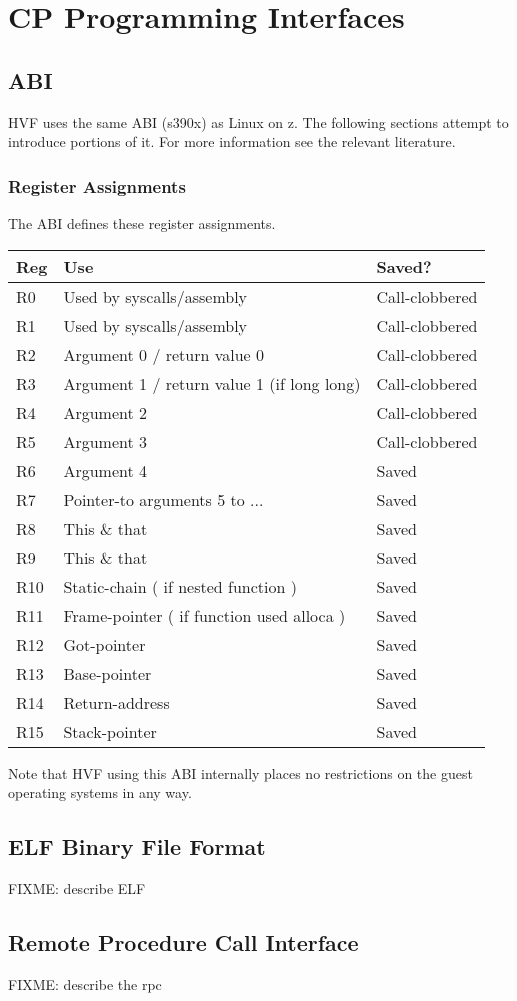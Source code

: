 \chapter{CP Programming Interfaces}
\section{ABI}
HVF uses the same ABI (s390x) as Linux on z.  The following sections attempt
to introduce portions of it.  For more information see the relevant
literature.

\subsection{Register Assignments}
The ABI defines these register assignments.

\begin{center}
\begin{tabular}{|l|l|l|}
\hline
Reg   &   Use                                        &Saved? \\
\hline\hline
R0    &   Used by syscalls/assembly                  &Call-clobbered \\
R1    &   Used by syscalls/assembly                  &Call-clobbered \\
R2    &   Argument 0 / return value 0                &Call-clobbered \\
R3    &   Argument 1 / return value 1 (if long long) &Call-clobbered \\
R4    &   Argument 2                                 &Call-clobbered \\
R5    &   Argument 3                                 &Call-clobbered \\
R6    &   Argument 4                                 &Saved \\
R7    &   Pointer-to arguments 5 to ...              &Saved \\
R8    &   This \& that                               &Saved \\
R9    &   This \& that                               &Saved \\
R10   &   Static-chain ( if nested function )        &Saved \\
R11   &   Frame-pointer ( if function used alloca )  &Saved \\
R12   &   Got-pointer                                &Saved \\
R13   &   Base-pointer                               &Saved \\
R14   &   Return-address                             &Saved \\
R15   &   Stack-pointer                              &Saved \\
\hline
\end{tabular}
\end{center}

Note that HVF using this ABI internally places no restrictions on the guest
operating systems in any way.

\section{ELF Binary File Format}
FIXME: describe ELF
\section{Remote Procedure Call Interface}
FIXME: describe the rpc
